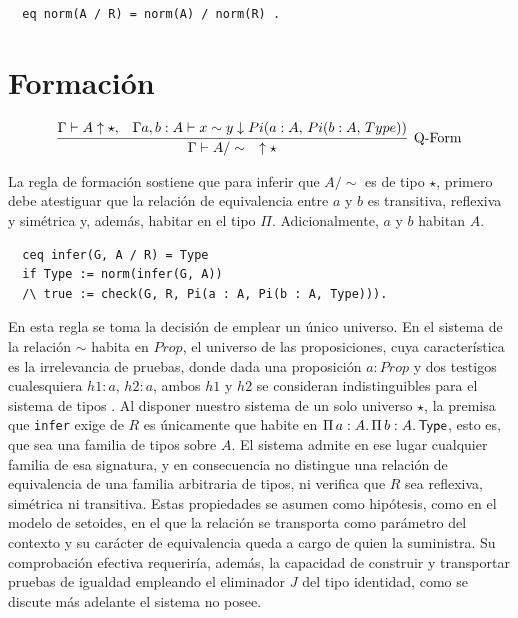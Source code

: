 \begin{lstlisting}
  eq norm(A / R) = norm(A) / norm(R) .
\end{lstlisting}

\section{Formación}
\begin{gather}
  \infer[\text{Q-Form}]
  {\Gamma \vdash A/\sim \quad \uparrow \star}
  {\Gamma \vdash A \uparrow \star, & \Gamma a, b : A \vdash x \sim y \downarrow Pi(a : A,\, Pi(b : A,\, Type))}
\end{gather}

La regla de formación sostiene que para inferir que $A/\sim$ es de tipo $\star$, primero $~$ debe atestiguar que la relación de equivalencia entre $a$ y $b$ es transitiva, reflexiva y simétrica y, además, habitar en el tipo $\Pi$. Adicionalmente, $a$ y $b$ habitan $A$. 
\newline
\begin{lstlisting}
  ceq infer(G, A / R) = Type
  if Type := norm(infer(G, A))
  /\ true := check(G, R, Pi(a : A, Pi(b : A, Type))).
\end{lstlisting}
\newline
\newline
\indent En esta regla se toma la decisión de emplear un único universo. En el sistema de \cite{nuoli} la relación $\sim$ habita en $Prop$, el universo de las proposiciones, cuya característica es la irrelevancia de pruebas, donde dada una proposición $a : Prop$ y dos testigos cualesquiera $h1 : a,\, h2: a$, ambos $h1$ y $h2$ se consideran indistinguibles para el sistema de tipos \citep{mathlib}. Al disponer nuestro sistema de un solo universo $\star$, la premisa que \texttt{infer} exige de $R$ es únicamente que habite en $\Pi\, a : A.\, \Pi\, b : A.\, \mathsf{Type}$, esto es, que sea una familia de tipos sobre $A$. El sistema admite en ese lugar cualquier familia de esa signatura, y en consecuencia no distingue una relación de equivalencia de una familia arbitraria de tipos, ni verifica que $R$ sea reflexiva, simétrica ni transitiva. Estas propiedades se asumen como hipótesis, como en el modelo de setoides, en el que la relación se transporta como parámetro del contexto y su carácter de equivalencia queda a cargo de quien la suministra. Su comprobación efectiva requeriría, además, la capacidad de construir y transportar pruebas de igualdad empleando el eliminador $J$ del tipo identidad, como se discute más adelante el sistema no posee.

